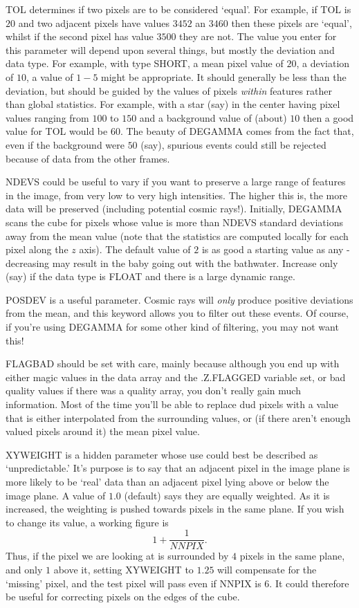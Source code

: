 TOL determines if two pixels are to be considered `equal'. For example, if TOL
is $20$ and two adjacent pixels have values $3452$ an $3460$ then these pixels
are `equal', whilst if the second pixel has value $3500$ they are not. The
value you enter for this parameter will depend upon several things, but mostly
the deviation and data type. For example, with type SHORT, a mean pixel value 
of $20$, a deviation of $10$, a value of $1-5$ might be appropriate. It should
generally be less than the deviation, but should be guided by the values of
pixels {\em within} features rather than global statistics. For example, with
a star (say) in the center having pixel values ranging from $100$ to $150$ and
a background value of (about) $10$ then a good value for TOL would be $60$. The
beauty of DEGAMMA comes from the fact that, even if the background were $50$
(say), spurious events could still be rejected because of data from the other
frames.

NDEVS could be useful to vary if you want to preserve a large range of features
in the image, from very low to very high intensities. The higher this is, the
more data will be preserved (including potential cosmic rays!).  Initially,
DEGAMMA scans the cube for pixels whose value is more than NDEVS standard
deviations away from the mean value (note that the statistics are computed
locally for each pixel along the $z$ axis). The default value of $2$
is as good a starting value as any - decreasing may result in the baby going
out with the bathwater. Increase only (say) if the data type is FLOAT and there
is a large dynamic range.

POSDEV is a useful parameter. Cosmic rays will {\em only} produce positive
deviations from the mean, and this keyword allows you to filter out these
events. Of course, if you're using DEGAMMA for some other kind of filtering,
you may not want this!

FLAGBAD should be set with care, mainly because although you end up with either
magic values in the data array and the .Z.FLAGGED variable set, or bad quality
values if there was a quality array, you don't really gain much information.
Most of the time you'll be able to replace dud pixels with a value that is
either interpolated from the surrounding values, or (if there aren't enough
valued pixels around it) the mean pixel value.

XYWEIGHT is a hidden parameter whose use could best be described as
`unpredictable.' It's purpose is to say that an adjacent pixel in the 
image plane is more likely to be `real' data than an adjacent pixel lying above
or below the image plane. A value of $1.0$ (default) says they are equally
weighted. As it is increased, the weighting is pushed towards pixels in the
same plane. If you wish to change its value, a working figure is
\begin{displaymath}
1+\frac{1}{NNPIX}.
\end{displaymath}
Thus, if the pixel we are looking at  is surrounded by $4$ pixels in the same
plane, and only $1$ above it, setting XYWEIGHT to $1.25$ will compensate for
the `missing' pixel, and the test pixel will pass even if NNPIX is $6$. It
could therefore be useful for correcting pixels on the edges of the cube.

